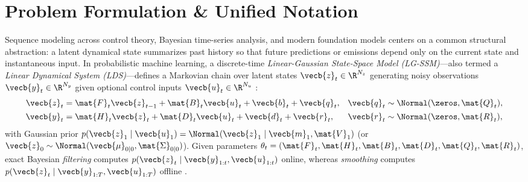 \documentclass[../../../../master.tex]{subfiles}
\begin{document}

\section{Problem Formulation \& Unified Notation}\label{sec:ssm:formulation}

Sequence modeling across control theory, Bayesian time-series analysis, and modern foundation models centers on a common structural abstraction: a latent dynamical state summarizes past history so that future predictions or emissions depend only on the current state and instantaneous input. In probabilistic machine learning, a discrete-time \emph{Linear-Gaussian State-Space Model (LG-SSM)}---also termed a \emph{Linear Dynamical System (LDS)}---defines a Markovian chain over latent states $\vecb{z}_t \in \R^{N_z}$ generating noisy observations $\vecb{y}_t \in \R^{N_y}$ given optional control inputs $\vecb{u}_t \in \R^{N_u}$ :
\begin{align}
  \vecb{z}_t &= \mat{F}_t \vecb{z}_{t-1} + \mat{B}_t \vecb{u}_t + \vecb{b}_t + \vecb{q}_t, & \vecb{q}_t &\sim \Normal(\zeros, \mat{Q}_t), \label{eq:ssm:lds_trans} \\
  \vecb{y}_t &= \mat{H}_t \vecb{z}_t + \mat{D}_t \vecb{u}_t + \vecb{d}_t + \vecb{r}_t, & \vecb{r}_t &\sim \Normal(\zeros, \mat{R}_t), \label{eq:ssm:lds_obs}
\end{align}
with Gaussian prior $p(\vecb{z}_1 \mid \vecb{u}_1) = \Normal(\vecb{z}_1 \mid \vecb{m}_1, \mat{V}_1)$ (or $\vecb{z}_0 \sim \Normal(\vecb{\mu}_{0|0}, \mat{\Sigma}_{0|0})$). Given parameters $\theta_t = (\mat{F}_t, \mat{H}_t, \mat{B}_t, \mat{D}_t, \mat{Q}_t, \mat{R}_t)$, exact Bayesian \emph{filtering} computes $p(\vecb{z}_t \mid \vecb{y}_{1:t}, \vecb{u}_{1:t})$ online, whereas \emph{smoothing} computes $p(\vecb{z}_t \mid \vecb{y}_{1:T}, \vecb{u}_{1:T})$ offline .
\end{document}
